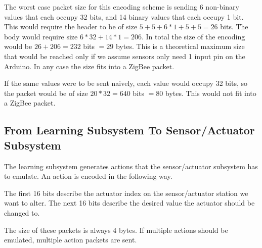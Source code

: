 The worst case packet size for this encoding scheme is sending 6 non-binary values that each occupy 32 bits, and 14 binary values that each occupy 1 bit. This would require the header to be of size $5 + 5 + 6 * 1 + 5 + 5 = 26$ bits. The body would require size $6 * 32 + 14 * 1 = 206$. In total the size of the encoding would be $26 + 206 = 232$ bits $= 29$ bytes. This is a theoretical maximum size that would be reached only if we assume sensors only need 1 input pin on the Arduino. In any case the size fits into a ZigBee packet.

If the same values were to be sent naively, each value would occupy 32 bits, so the packet would be of size $20 * 32 = 640$ bits $=80$ bytes. This would not fit into a ZigBee packet.

\subsection{From  Learning Subsystem To Sensor/Actuator Subsystem}

The learning subsystem generates actions that the sensor/actuator subsystem has to emulate. An action is encoded in the following way.

The first 16 bits describe the actuator index on the sensor/actuator station we want to alter. The next 16 bits describe the desired value the actuator should be changed to.

The size of these packets is always 4 bytes. If multiple actions should be emulated, multiple action packets are sent.
